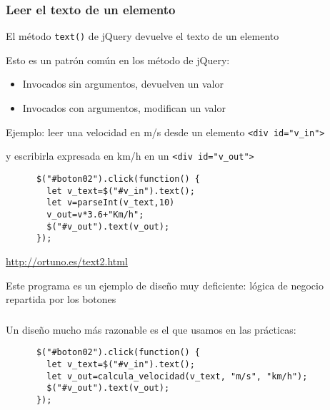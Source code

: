 \documentclass[ucs]{beamer}
\begin{document}
\begin{frame}[fragile]
\frametitle{Leer el texto de un elemento}
El método 
\verb|text()| de jQuery devuelve el texto de un elemento

Esto es un patrón común en los método de jQuery:
\begin{itemize}
\item
Invocados sin argumentos, devuelven un valor

\item
Invocados con argumentos, modifican un valor
\end{itemize}

Ejemplo: leer una velocidad en m/s desde un 
elemento 
\verb|<div id="v_in">|

y escribirla expresada en km/h en un 
\verb|<div id="v_out">|

  \begin{scriptsize}
  \begin{verbatim}
      $("#boton02").click(function() {
        let v_text=$("#v_in").text();
        let v=parseInt(v_text,10)
        v_out=v*3.6+"Km/h";
        $("#v_out").text(v_out);
      });
  \end{verbatim}
  \end{scriptsize}

\begin{tiny}
\begin{flushright}
\url{http://ortuno.es/text2.html}
\end{flushright}
\end{tiny}

Este programa es un ejemplo de diseño muy deficiente: lógica
de negocio repartida por los botones

\end{frame}


\begin{frame}[fragile]

\frametitle{}
Un diseño mucho más razonable es el que usamos en las
prácticas:
  \begin{scriptsize}
  \begin{verbatim}
      $("#boton02").click(function() {
        let v_text=$("#v_in").text();
        let v_out=calcula_velocidad(v_text, "m/s", "km/h");
        $("#v_out").text(v_out);
      });
  \end{verbatim}
  \end{scriptsize}
\end{frame}
\end{document}

